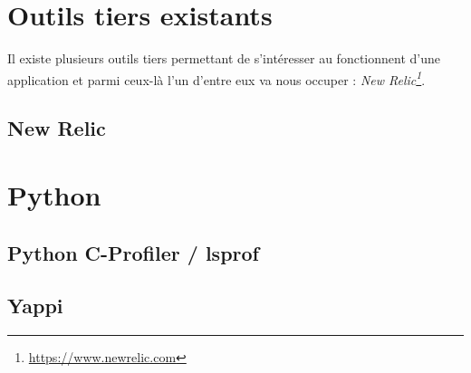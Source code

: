 		\section{Outils tiers existants}
Il existe plusieurs outils tiers permettant de s'intéresser au fonctionnent d'une application \Python et parmi ceux-là l'un d'entre eux va nous occuper : \emph{New Relic\footnote{\url{https://www.newrelic.com}}}. %

			\subsection{New Relic}
			\label{sec:new-relic}
          		
			
		\section{Python}
			\subsection{Python C-Profiler / \textunderscore lsprof} 
			\label{subsec:cprofiler}
				
			\subsection{Yappi}
			\label{subsec:yappi}
				
				
				
				
				
				
				
				
				
				
				
				
				
				
				
				
				
				
				
				
				
				
				
				
				
				
				
				
				
				
				
				
				
				